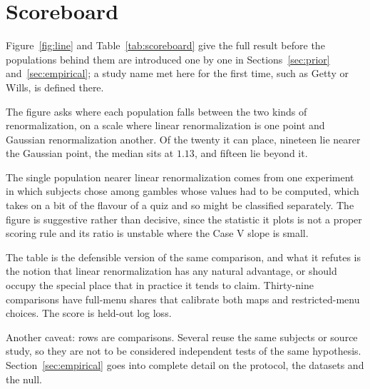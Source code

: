 \documentclass[11pt]{article}
\begin{document}
\section{Scoreboard}

Figure~\ref{fig:line} and Table~\ref{tab:scoreboard} give the full result before the
populations behind them are introduced one by one in Sections~\ref{sec:prior}
and~\ref{sec:empirical}; a study name met here for the first time, such as Getty or Wills, is
defined there.

The figure asks where each population falls between the two kinds of renormalization, on a scale
where linear renormalization is one point and Gaussian renormalization another. Of the twenty it
can place, nineteen lie nearer the Gaussian point, the median sits at $1.13$, and fifteen lie
beyond it.

The single population nearer linear renormalization comes from one experiment in which subjects
chose among gambles whose values had to be computed, which takes on a bit of the flavour of a quiz
and so might be classified separately. The figure is suggestive rather than decisive, since the
statistic it plots is not a proper scoring rule and its ratio is unstable where the Case V slope
is small.

The table is the defensible version of the same comparison, and what it refutes is the notion that
linear renormalization has any natural advantage, or should occupy the special place that in
practice it tends to claim. Thirty-nine comparisons have full-menu shares that
calibrate both maps and restricted-menu choices. The score is held-out log loss.

Another caveat: rows are comparisons. Several reuse the same subjects or source study, so they are
not to be considered independent tests of the same hypothesis. Section~\ref{sec:empirical} goes
into complete detail on the protocol, the datasets and the null.
\end{document}
